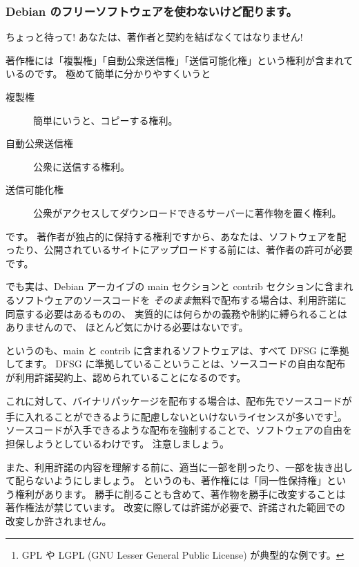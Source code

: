 \documentclass[mingoth,a4paper]{jsarticle}
\begin{document}



\subsubsection{Debian のフリーソフトウェアを使わないけど配ります。}

ちょっと待って! あなたは、著作者と契約を結ばなくてはなりません!

著作権には「複製権」「自動公衆送信権」「送信可能化権」という権利が含まれているのです。
極めて簡単に分かりやすくいうと
\begin{description}
\item[複製権 ] 簡単にいうと、コピーする権利。
\item[自動公衆送信権] 公衆に送信する権利。
\item[送信可能化権] 公衆がアクセスしてダウンロードできるサーバーに著作物を置く権利。
\end{description}
です。
著作者が独占的に保持する権利ですから、あなたは、ソフトウェアを配ったり、公開されているサイトにアップロードする前には、著作者の許可が必要です。


でも実は、Debian アーカイブの main セクションと contrib セクションに含まれるソフトウェアのソースコードを
{\em そのまま}無料で配布する場合は、利用許諾に同意する必要はあるものの、
実質的には何らかの義務や制約に縛られることはありませんので、
ほとんど気にかける必要はないです。

というのも、main と contrib に含まれるソフトウェアは、すべて DFSG\cite{DFSG} に準拠してます。
DFSG に準拠しているこということは、ソースコードの自由な配布が利用許諾契約上、認められていることになるのです。

これに対して、バイナリパッケージを配布する場合は、配布先でソースコードが手に入れることができるように配慮しないといけないライセンスが多いです\footnote{GPL や LGPL (GNU Lesser General Public License)  が典型的な例です。}。
ソースコードが入手できるような配布を強制することで、ソフトウェアの自由を担保しようとしているわけです。
注意しましょう。


また、利用許諾の内容を理解する前に、適当に一部を削ったり、一部を抜き出して配らないようにしましょう。
というのも、著作権には「同一性保持権」という権利があります。
勝手に削ることも含めて、著作物を勝手に改変することは著作権法が禁じています。
改変に際しては許諾が必要で、許諾された範囲での改変しか許されません。
\end{document}

